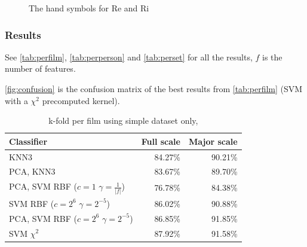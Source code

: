 \begin{figure}[htbp]
  \centering
{}
\hspace{0.03\linewidth}
  \caption{The hand symbols for Re and Ri}
  \label{fig:reri}
\end{figure}


\subsubsection{Results}
See \autoref{tab:perfilm}, \autoref{tab:perperson} and \autoref{tab:perset} for all the results, $f$ is the number of features.

\autoref{fig:confusion} is the confusion matrix of the best results from \autoref{tab:perfilm} (SVM with a $\chi^2$ precomputed kernel).

\begin{table}
\centering
\begin{tabular}{lrr}
\hline\hline
Classifier 				&  	Full scale	& Major scale	\\
\hline
KNN3 		&  	84.27\%		& 90.21\%		\\
PCA, KNN3 	& 	83.67\%		& 89.70\%		\\
PCA, SVM RBF ($c=1$ $\gamma=\frac{1}{|f|}$)	& 	76.78\%		& 84.38\%		\\
SVM RBF ($c=2^6$ $\gamma=2^{-5}$) & 86.02\% & 90.88\% \\
PCA, SVM RBF ($c=2^6$ $\gamma=2^{-5}$) &  86.85\% & 91.85\% \\
SVM $\chi^2$ & 87.92\% 		& 91.58\% \\
\hline
\end{tabular}
\caption{k-fold per film using simple dataset only,}
\label{tab:perfilm}
\end{table}


